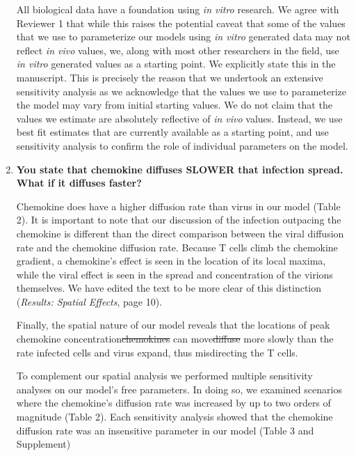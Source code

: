 \documentclass[10pt]{article}
\newcommand{\removed}[1]{{\color{dkred}\sout{#1}}}
\newcommand{\new}[1]{{\color{dkgreen}#1}}
\newenvironment{response}{\fontfamily{cmr}}{\par}
\begin{document}
\begin{enumerate}
\begin{response}
All biological data have a foundation using \textit{in vitro} research. We agree with Reviewer 1 that while this raises the potential caveat that some of the values that we use to parameterize our models using \textit{in vitro} generated data may not reflect \textit{in vivo} values, we, along with most other researchers in the field, use \textit{in vitro} generated values as a starting point. We explicitly state this in the manuscript. This is precisely the reason that we undertook an extensive sensitivity analysis as we acknowledge that the values we use to parameterize the model may vary from initial starting values. We do not claim that the values we estimate are absolutely reflective of \textit{in vivo} values. Instead, we use best fit estimates that are currently available as a starting point, and use sensitivity analysis to confirm the role of individual parameters on the model.​
\end{response}

\item \textbf{You state that chemokine diffuses SLOWER that infection spread. What if it diffuses faster?}

\begin{response}

Chemokine does have a higher diffusion rate than virus in our model (Table 2).  It is important to note that our discussion of the infection outpacing the chemokine is different than the direct comparison between the viral diffusion rate and the chemokine diffusion rate.  Because T cells climb the chemokine gradient, a chemokine's effect is seen in the location of its local maxima, while the viral effect is seen in the spread and concentration of the virions themselves.  We have edited the text to be more clear of this distinction (\textit{Results: Spatial Effects}, page 10).

\begin{displayquote}
Finally, the spatial nature of our model reveals that \new{the locations of peak chemokine concentration}\removed{chemokines} can \new{move}\removed{diffuse} more slowly than the rate infected cells and virus expand, thus misdirecting the T cells.
\end{displayquote}

To complement our spatial analysis we performed multiple sensitivity analyses on our model's free parameters.  In doing so, we examined scenarios where the chemokine's diffusion rate was increased by up to two orders of magnitude (Table 2).  Each sensitivity analysis showed that the chemokine diffusion rate was an insensitive parameter in our model (Table 3 and Supplement)


\end{response}
\end{enumerate}
\end{document}
